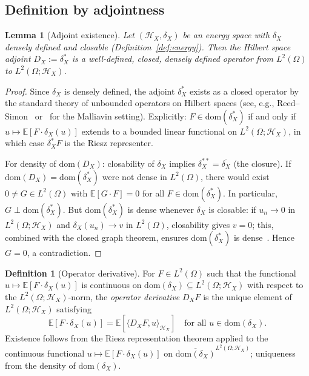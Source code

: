 \documentclass[11pt,a4paper]{article}
\theoremstyle{plain}
\newtheorem{lemma}[theorem]{Lemma}
\theoremstyle{definition}
\newtheorem{definition}[theorem]{Definition}
\theoremstyle{remark}
\newcommand{\E}{\mathbb{E}}
\newcommand{\dom}{\mathrm{dom}}
\newcommand{\HX}{\mathcal{H}_X}
\begin{document}
\subsection{Definition by adjointness}

\begin{lemma}[Adjoint existence]\label{lem:adjoint}
Let $(\HX, \delta_X)$ be an energy space with $\delta_X$ densely defined and closable (Definition~\ref{def:energy}). Then the Hilbert space adjoint $D_X := \delta_X^*$ is a well-defined, closed, densely defined operator from $L^2(\Omega)$ to $L^2(\Omega; \HX)$.
\end{lemma}

\begin{proof}
Since $\delta_X$ is densely defined, the adjoint $\delta_X^*$ exists as a closed operator by the standard theory of unbounded operators on Hilbert spaces (see, e.g., Reed--Simon~\cite[Theorem VIII.1]{ReedSimon1980} or~\cite[Proposition~1.3.1]{Nualart2006} for the Malliavin setting). Explicitly: $F \in \dom(\delta_X^*)$ if and only if $u \mapsto \E[F \cdot \delta_X(u)]$ extends to a bounded linear functional on $L^2(\Omega;\HX)$, in which case $\delta_X^*F$ is the Riesz representer.

For density of $\dom(D_X)$: closability of $\delta_X$ implies $\delta_X^{**} = \overline{\delta_X}$ (the closure). If $\dom(D_X) = \dom(\delta_X^*)$ were not dense in $L^2(\Omega)$, there would exist $0 \neq G \in L^2(\Omega)$ with $\E[G \cdot F] = 0$ for all $F \in \dom(\delta_X^*)$. In particular, $G \perp \dom(\delta_X^*)$. But $\dom(\delta_X^*)$ is dense whenever $\delta_X$ is closable: if $u_n \to 0$ in $L^2(\Omega;\HX)$ and $\delta_X(u_n) \to v$ in $L^2(\Omega)$, closability gives $v = 0$; this, combined with the closed graph theorem, ensures $\dom(\delta_X^*)$ is dense~\cite[Chapter~5.2]{Kato1995}. Hence $G = 0$, a contradiction.
\end{proof}

\begin{definition}[Operator derivative]\label{def:opderiv}
For $F \in L^2(\Omega)$ such that the functional $u \mapsto \E[F \cdot \delta_X(u)]$ is continuous on $\dom(\delta_X) \subseteq L^2(\Omega; \HX)$ with respect to the $L^2(\Omega; \HX)$-norm, the \emph{operator derivative} $D_X F$ is the unique element of $L^2(\Omega; \HX)$ satisfying
\begin{equation}\label{eq:adj}
\E[F \cdot \delta_X(u)] = \E[\langle D_X F, u \rangle_{\HX}] \quad \text{for all } u \in \dom(\delta_X).
\end{equation}
Existence follows from the Riesz representation theorem applied to the continuous functional $u \mapsto \E[F \cdot \delta_X(u)]$ on $\overline{\dom(\delta_X)}^{L^2(\Omega;\HX)}$; uniqueness from the density of $\dom(\delta_X)$.
\end{definition}
\end{document}
